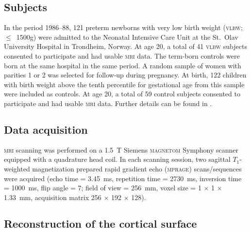 \subsection{Subjects}

In the period 1986--88, 121 preterm newborns with very low birth weight (\textsc{vlbw}; $\leqslant$~1500g) were admitted to the Neonatal Intensive Care Unit at the St.\ Olav University Hospital in Trondheim, Norway. At age 20, a total of 41 \textsc{vlbw} subjects consented to participate and had usable \textsc{mri} data. The term-born controls were born at the same hospital in the same period. A random sample of women with parities 1 or 2 was selected for follow-up during pregnancy. At birth, 122 children with birth weight above the tenth percentile for gestational age from this sample were included as controls. At age 20, a total of 59 control subjects consented to participate and had usable \textsc{mri} data. Further details can be found in \citet{Martinussen2005, Skranes2007}.

\subsection{Data acquisition}

\textsc{mri} scanning was performed on a 1.5~T Siemens \textsc{magnetom} Symphony scanner equipped with a quadrature head coil. In each scanning session, two sagittal $T_1$-weighted magnetization prepared rapid gradient echo (\textsc{mprage}) scans/sequences were acquired (echo time = 3.45~ms, repetition time = 2730~ms, inversion time = 1000~ms, flip angle = 7\degree; field of view = 256~mm, voxel size = 1 $\times$ 1 $\times$ 1.33~mm, acquisition matrix 256 $\times$ 192 $\times$ 128).  

\subsection{Reconstruction of the cortical surface}

